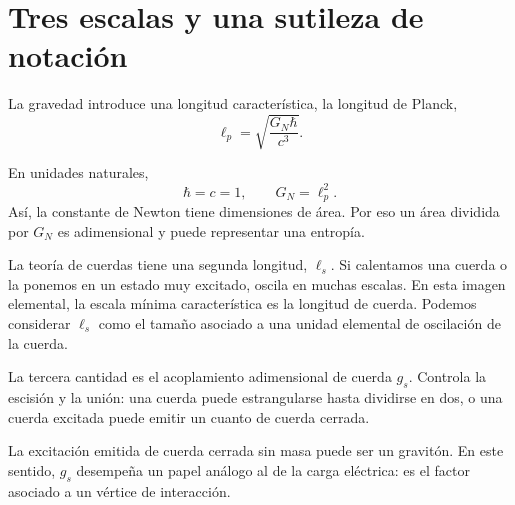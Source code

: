 \section{Tres escalas y una sutileza de notación}

La gravedad introduce una longitud característica, la longitud de Planck,
\begin{equation}
\ell_p=\sqrt{\frac{G_N\hbar}{c^3}}.
\label{eq:l06-planck-si}
\end{equation}

\begin{classroomqa}\end{classroomqa}

En unidades naturales,
\begin{equation}
\hbar=c=1,
\qquad
G_N=\ell_p^2.
\label{eq:l06-planck-area}
\end{equation}
Así, la constante de Newton tiene dimensiones de área. Por eso un área dividida por \(G_N\) es adimensional y puede representar una entropía.

La teoría de cuerdas tiene una segunda longitud, \(\ell_s\). Si calentamos una cuerda o la ponemos en un estado muy excitado, oscila en muchas escalas. En esta imagen elemental, la escala mínima característica es la longitud de cuerda. Podemos considerar \(\ell_s\) como el tamaño asociado a una unidad elemental de oscilación de la cuerda.

La tercera cantidad es el acoplamiento adimensional de cuerda \(g_s\). Controla la escisión y la unión: una cuerda puede estrangularse hasta dividirse en dos, o una cuerda excitada puede emitir un cuanto de cuerda cerrada.

\begin{classroomqa}\end{classroomqa}

La excitación emitida de cuerda cerrada sin masa puede ser un gravitón. En este sentido, \(g_s\) desempeña un papel análogo al de la carga eléctrica: es el factor asociado a un vértice de interacción.


